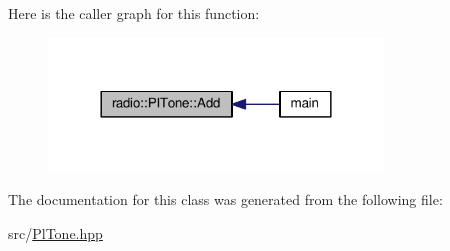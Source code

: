 Here is the caller graph for this function\+:
\nopagebreak
\begin{figure}[H]
\begin{center}
\leavevmode
\includegraphics[width=252pt]{classradio_1_1PlTone_a9e19b2d5106b35626d4839f04f9b9f95_icgraph}
\end{center}
\end{figure}




The documentation for this class was generated from the following file\+:\begin{DoxyCompactItemize}
\item 
src/\hyperlink{PlTone_8hpp}{Pl\+Tone.\+hpp}\end{DoxyCompactItemize}
